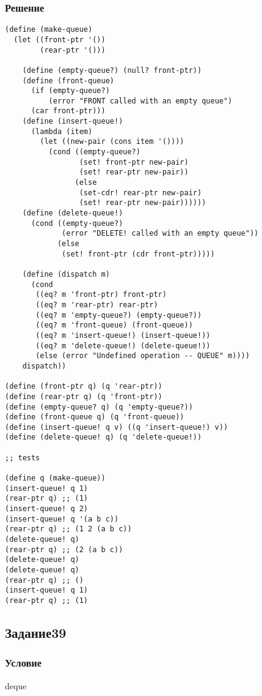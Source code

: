 \documentclass[10pt,a4paper]{article}
\begin{document}
\subsubsection*{Решение}
\begin{lstlisting}
(define (make-queue)
  (let ((front-ptr '())
        (rear-ptr '()))

    (define (empty-queue?) (null? front-ptr))
    (define (front-queue)
      (if (empty-queue?)
          (error "FRONT called with an empty queue")
      (car front-ptr)))
    (define (insert-queue!)
      (lambda (item)
        (let ((new-pair (cons item '())))
          (cond ((empty-queue?)
                 (set! front-ptr new-pair)
                 (set! rear-ptr new-pair))
                (else
                 (set-cdr! rear-ptr new-pair)
                 (set! rear-ptr new-pair))))))
    (define (delete-queue!)
      (cond ((empty-queue?)
             (error "DELETE! called with an empty queue"))
            (else
             (set! front-ptr (cdr front-ptr)))))

    (define (dispatch m)
      (cond
       ((eq? m 'front-ptr) front-ptr)
       ((eq? m 'rear-ptr) rear-ptr)
       ((eq? m 'empty-queue?) (empty-queue?))
       ((eq? m 'front-queue) (front-queue))
       ((eq? m 'insert-queue!) (insert-queue!))
       ((eq? m 'delete-queue!) (delete-queue!))
       (else (error "Undefined operation -- QUEUE" m))))
    dispatch))

(define (front-ptr q) (q 'rear-ptr))
(define (rear-ptr q) (q 'front-ptr))
(define (empty-queue? q) (q 'empty-queue?))
(define (front-queue q) (q 'front-queue))
(define (insert-queue! q v) ((q 'insert-queue!) v))
(define (delete-queue! q) (q 'delete-queue!))

;; tests

(define q (make-queue))
(insert-queue! q 1)
(rear-ptr q) ;; (1)
(insert-queue! q 2)
(insert-queue! q '(a b c))
(rear-ptr q) ;; (1 2 (a b c))
(delete-queue! q)
(rear-ptr q) ;; (2 (a b c))
(delete-queue! q)
(delete-queue! q)
(rear-ptr q) ;; ()
(insert-queue! q 1)
(rear-ptr q) ;; (1)

\end{lstlisting}

\subsection*{Задание39}
\subsubsection*{Условие}
deque
\end{document}
